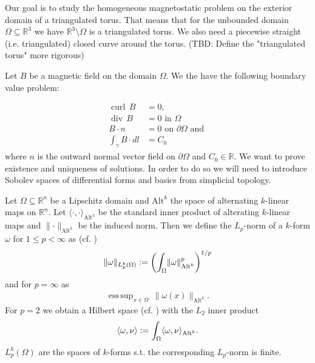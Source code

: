 \documentclass[12pt,a4paper]{article}
\theoremstyle{definition}
\DeclareMathOperator*{\esssup}{ess\,sup}
\DeclareMathOperator{\curl}{curl}
\DeclareMathOperator{\diver}{div}
\newcommand{\real}{\mathbb{R}}
\begin{document}
Our goal is to study the homogeneous magnetostatic problem on the exterior 
domain of a triangulated torus. That means 
that for the unbounded domain  $\Omega \subseteq \real^3$ we have
$\real^3 \setminus \Omega$ is a triangulated torus. We also need a 
piecewise straight (i.e. triangulated) closed curve around the torus.
{\color{red} (TBD: Define the "triangulated torus" more rigorous)}

Let $B$ be a magnetic field on the domain $\Omega$.
We the have the following boundary value problem:

\begin{align}
    \curl \, B &= 0, \\ 
    \diver \, B  &= 0 \text{ in } \Omega \\
    B \cdot n &= 0 \text{ on } \partial \Omega \text{ and }\\
    \int_\gamma B \cdot dl &= C_0
\end{align}
where $n$ is the outward normal vector field on $\partial \Omega$ and 
$C_0 \in \real$. We want to prove existence and uniqueness of 
solutions. In order to do so we will need to introduce Sobolev spaces of 
differential forms and basics from
simplicial topology.


Let $\Omega \subseteq \real^n$ be a Lipschitz domain and $\text{Alt}^k$ 
the space of alternating $k$-linear maps on $\real^n$. 
Let $\langle \cdot,\cdot\rangle_{\text{Alt}^k}$ be the standard inner
product of alterating $k$-linear maps and 
$\lVert \cdot \rVert _{\text{Alt}^k}$ be the induced norm. Then
we define the $L_p$-norm of a $k$-form $\omega$ for $1\leq p < \infty$
as (cf. \cite{goldshtein})
\begin{align*}
\lVert \omega \rVert _{L_p^k(\Omega)}\vcentcolon=
\left(\int_\Omega \lVert \omega \rVert _{\text{Alt}^k}^p \right)^{1/p}
\end{align*}
and for $p=\infty$ as
\begin{align*}
\esssup_{x\in \Omega} \, \lVert \omega(x) \rVert _{\text{Alt}^k}.
\end{align*}
For $p=2$ we obtain a Hilbert space (cf. \cite[Sec. 6.2.6]{arnold}) 
with the $L_2$ inner product  
\begin{align}
\langle \omega, \nu \rangle \vcentcolon= 
\int_\Omega \langle \omega, \nu \rangle _{\text{Alt}^k}. 
\label{def_inner_product}
\end{align}
$L_p^k(\Omega)$ are the spaces of $k$-forms 
s.t. the corresponding $L_p$-norm is finite. \par
\end{document}
